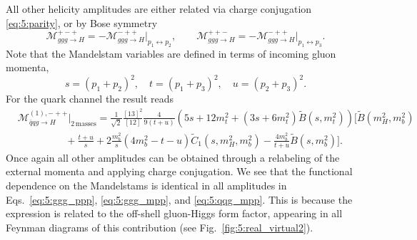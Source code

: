 All other helicity amplitudes are either related via charge conjugation \eqref{eq:5:parity}, or by Bose symmetry
\begin{equation}
\mathcal{M}_{ggg \rightarrow H}^{+-+} = -\mathcal{M}_{ggg \rightarrow H}^{-++} \bigg \vert_{p_1 \leftrightarrow p_2}, \qquad \mathcal{M}_{ggg \rightarrow H}^{++-} = -\mathcal{M}_{ggg \rightarrow H}^{-++} \bigg \vert_{p_1 \leftrightarrow p_3}.
\label{eq:5:momentum_exchange}
\end{equation}
Note that the Mandelstam variables are defined in terms of incoming gluon momenta, \ie\
\begin{equation}
s = (p_1 + p_2)^2, \quad t = (p_1 + p_3)^2, \quad u = (p_2 + p_3)^2.
\end{equation}
For the quark channel the result reads
\begin{equation}
\begin{split}
&\mathcal{M}_{\bar{q}q g \rightarrow H}^{(1),-++} \bigg \vert_{2\, \text{masses}} =  \frac{1}{\sqrt{2}} \frac{[13]^2}{[12]}  \frac{4 }{9 (t + u)} \left(5 s + 12 m_t^2 + (3 s + 6 m_t^2) \tilde{B}\!(s, m_t^2) \right)\bigg [\tilde{B}\!(m_H^2, m_b^2) \\
& \hspace{2cm}  + \frac{t + u}{s} + 2 \frac{m_b^2}{s} \left(4m_b^2 - t - u  \right) \tilde{C}_1\!(s, m_H^2, m_b^2) - \frac{4 m_b^2}{t + u}\tilde{B}\!(s, m_b^2) \bigg ].
\label{eq:5:qqg_mpp}
\end{split}
\end{equation}
Once again all other amplitudes can be obtained through a relabeling of the external momenta and applying charge conjugation. We see that the functional dependence on the Mandelstams is identical in all amplitudes in Eqs.~\eqref{eq:5:ggg_ppp}, \eqref{eq:5:ggg_mpp}, and \eqref{eq:5:qqg_mpp}. This is because the expression is related to the off-shell gluon-Higgs form factor, appearing in all Feynman diagrams of this contribution (see Fig.~\ref{fig:5:real_virtual2}).

